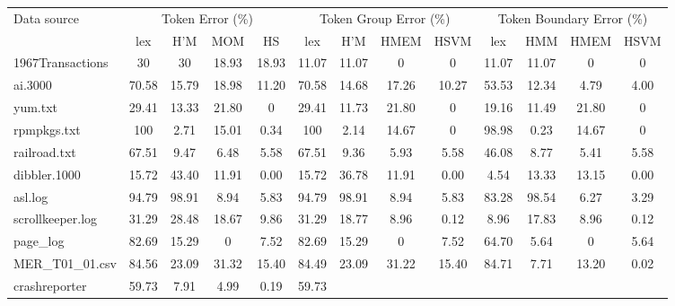 \begin{table}
\begin{center}
\begin{tabular}{|l||c|c|c|c||c|c|c|c||c|c|c|c|} \hline
Data source        & \multicolumn{4}{|c||}{Token Error (\%)} &
               \multicolumn{4}{|c||}{Token Group Error (\%)} &
               \multicolumn{4}{|c|}{Token Boundary Error (\%)} \\ \cline{2-13}
               & lex   & H'M   & MOM  & HS & lex & H'M & HMEM &
               HSVM & lex & HMM & HMEM & HSVM \\\hline\hline
1967Transactions     & 30    & 30    & 18.93 & 18.93 & 11.07 &
               11.07 & 0     & 0     & 11.07 & 11.07 & 0     & 0     \\ \hline
ai.3000                    & 70.58 & 15.79 & 18.98 & 11.20 & 70.58 &
               14.68 & 17.26 & 10.27 & 53.53 & 12.34 & 4.79  & 4.00  \\ \hline
yum.txt                    & 29.41 & 13.33 & 21.80 & 0     & 29.41 &
               11.73 & 21.80 & 0     & 19.16 & 11.49 & 21.80 & 0     \\ \hline
rpmpkgs.txt                & 100   & 2.71  & 15.01 & 0.34  & 100   &
               2.14  & 14.67     & 0     & 98.98 & 0.23  & 14.67     & 0     \\ \hline
railroad.txt               & 67.51 & 9.47  & 6.48  & 5.58     &
67.51 &
               9.36  & 5.93  & 5.58     & 46.08 & 8.77  & 5.41  & 5.58     \\ \hline
dibbler.1000               & 15.72 & 43.40     & 11.91     & 0.00 &
15.72 & 36.78
                     & 11.91     & 0.00     & 4.54  & 13.33 & 13.15     & 0.00     \\ \hline
asl.log                    & 94.79 & 98.91 & 8.94  & 5.83  & 94.79 &
               98.91 & 8.94  & 5.83  & 83.28 & 98.54 & 6.27  & 3.29  \\ \hline
scrollkeeper.log           & 31.29 & 28.48 & 18.67 & 9.86  & 31.29 &
               18.77 & 8.96  & 0.12  & 8.96  & 17.83 & 8.96  & 0.12  \\ \hline
page\_log                  & 82.69 & 15.29 & 0     & 7.52  & 82.69 &
               15.29 & 0     & 7.52  & 64.70 & 5.64  & 0     & 5.64  \\ \hline
MER\_T01\_01.csv           & 84.56 & 23.09 & 31.32 & 15.40     &
84.49 &
               23.09 & 31.22 & 15.40     & 84.71 & 7.71  & 13.20 & 0.02 \\ \hline
crashreporter          & 59.73 & 7.91     & 4.99  & 0.19  & 59.73 &

\end{tabular}
\end{center}
\end{table}
